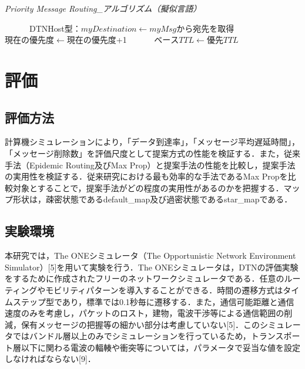 \documentclass[11pt]{icsthesis}
\begin{document}
\makeatletter
    \renewcommand{\ALG@name}{アルゴリズム}
    \makeatother
    \begin{algorithm}[tb]
    \caption{\it{Priority Message Routing\_アルゴリズム（擬似言語）}}
    \begin{algorithmic}[1]

    　　　\State DTNHost型：$myDestination \gets myMsg$から宛先を取得
            　　\State $現在の優先度 \gets 現在の優先度$+1
          　　　\State $ベースTTL \gets 優先TTL$
            \EndIf
    \EndFor
    \end{algorithmic}
    \end{algorithm}

\chapter{評価}
\section{評価方法}
計算機シミュレーションにより，「データ到達率」，「メッセージ平均遅延時間」，「メッセージ削除数」を評価尺度として提案方式の性能を検証する．また，従来手法（Epidemic Routing及びMax Prop）と提案手法の性能を比較し，提案手法の実用性を検証する．従来研究における最も効率的な手法であるMax Propを比較対象とすることで，提案手法がどの程度の実用性があるのかを把握する．マップ形状は，疎密状態であるdefault\_map及び過密状態であるstar\_mapである．

\section{実験環境}
本研究では，The ONEシミュレータ（The Opportunistic Network Environment Simulator）[5]を用いて実験を行う．The ONEシミュレータは，DTNの評価実験をするために作成されたフリーのネットワークシミュレータである．任意のルーティングやモビリティパターンを導入することができる．時間の遷移方式はタイムステップ型であり，標準では0.1秒毎に遷移する．また，通信可能距離と通信速度のみを考慮し，パケットのロスト，建物，電波干渉等による通信範囲の削減，保有メッセージの把握等の細かい部分は考慮していない[5]．このシミュレータではバンドル層以上のみでシミュレーションを行っているため，トランスポート層以下に関わる電波の輻輳や衝突等については，パラメータで妥当な値を設定しなければならない[9]．
\end{document}
